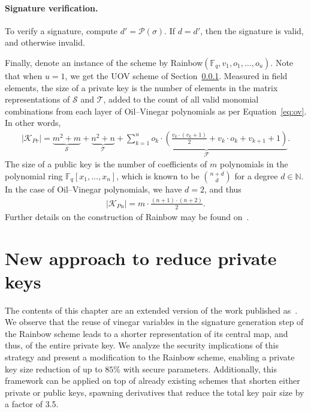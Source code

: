 \documentclass[draft, 12pt, a4paper, oneside]{memoir}
\theoremstyle{definition}
\theoremstyle{remark}
\begin{document}
\subsubsection{Signature verification.}

To verify a signature, compute $d' = \mathcal{P}(\sigma)$. If $d = d'$, then
the signature is valid, and otherwise invalid.

Finally, denote an instance of the scheme by Rainbow$(\mathbb{F}_{q}, v_{1}, o_{1}, \dots, o_{u})$. Note that when $u = 1$, we get the UOV scheme of Section~\ref{}. Measured in field elements, the size of a private key is the number of elements in the matrix representations of $\mathcal{S}$ and $\mathcal{T}$, added to the count of all valid monomial combinations from each layer of Oil--Vinegar polynomials as per Equation~\ref{eq:ov}. In other words,
\begin{align}
  |\mathcal{K}_{Pr}| = \underbrace{m^{2} + m}_{\mathcal{S}} 
    + \underbrace{n^{2} + n}_{\mathcal{T}}
    + \underbrace{\sum_{k = 1}^{u} o_{k} \cdot \left( \frac{v_{k} \cdot (v_{k} + 1)}{2}
      + v_{k} \cdot o_{k} + v_{k + 1} + 1 \right)}_{\mathcal{F}}.
\end{align}
The size of a public key is the number of coefficients of $m$ polynomials in the polynomial ring $\mathbb{F}_{q}[x_{1}, \dots, x_{n}]$, which is known to be $\binom{n + d}{d}$ for a degree $d \in \mathbb{N}$. In the case of Oil--Vinegar polynomials, we have $d = 2$, and thus
\begin{align}
  |\mathcal{K}_{Pu}| = m \cdot \frac{(n + 1) \cdot (n + 2)}{2}.
\end{align}
Further details on the construction of Rainbow may be found
on~\cite[Section 3.3]{Ding:2006}.

\chapter{New approach to reduce private keys}\label{chapter:eta}

The contents of this chapter are an extended version of the work published as~\cite{Zambonin:201907}. We observe that the reuse of vinegar variables in the signature generation step of the Rainbow scheme leads to a shorter representation of its central map, and thus, of the entire private key. We analyze the security implications of this strategy and present a modification to the Rainbow scheme, enabling a private key size reduction of up to $85\%$ with secure parameters. Additionally, this framework can be applied on top of already existing schemes that shorten either private or public keys, spawning derivatives that reduce the total key pair size by a factor of 3.5.
\end{document}
